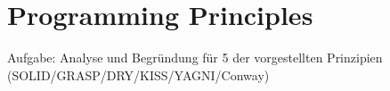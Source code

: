 \chapter{Programming Principles}
Aufgabe: Analyse und Begründung für 5 der vorgestellten Prinzipien (SOLID/GRASP/DRY/KISS/YAGNI/Conway)